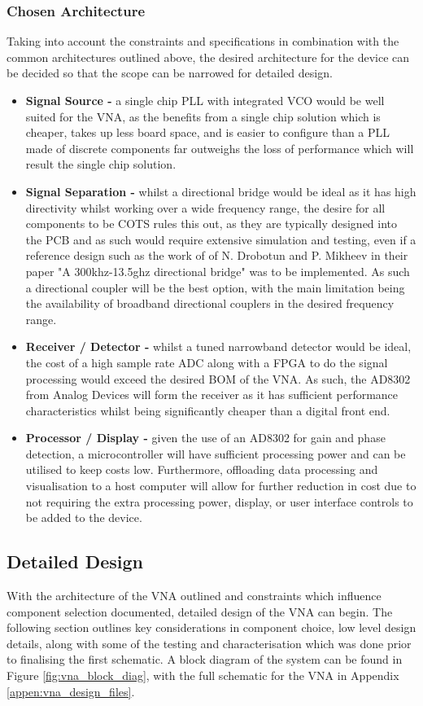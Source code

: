 \subsubsection{Chosen Architecture} 
\label{subsubsec:chosen architecture}
Taking into account the constraints and specifications in combination with the common architectures outlined above, the desired architecture for the device can be decided so that the scope can be narrowed for detailed design. 
\begin{itemize}
	\item \textbf{Signal Source -} a single chip PLL with integrated VCO would be well suited for the VNA, as the benefits from a single chip solution which is cheaper, takes up less board space, and is easier to configure than a PLL made of discrete components far outweighs the loss of performance which will result the single chip solution. 
	\item \textbf{Signal Separation -} whilst a directional bridge would be ideal as it has high directivity whilst working over a wide frequency range, the desire for all components to be COTS rules this out, as they are typically designed into the PCB and as such would require extensive simulation and testing, even if a reference design such as the work of of N. Drobotun and P. Mikheev in their paper "A 300khz-13.5ghz directional bridge" \cite{resistive_coupler} was to be implemented. As such a directional coupler will be the best option, with the main limitation being the availability of broadband directional couplers in the desired frequency range. 
	\item \textbf{Receiver / Detector -} whilst a tuned narrowband detector would be ideal, the cost of a high sample rate ADC along with a FPGA to do the signal processing would exceed the desired BOM of the VNA. As such, the AD8302 from Analog Devices will form the receiver as it has sufficient performance characteristics whilst being significantly cheaper than a digital front end. 
	\item \textbf{Processor / Display -} given the use of an AD8302 for gain and phase detection, a microcontroller will have sufficient processing power and can be utilised to keep costs low. Furthermore, offloading data processing and visualisation to a host computer will allow for further reduction in cost due to not requiring the extra processing power, display, or user interface controls to be added to the device.
\end{itemize}

\subsection{Detailed Design}
\label{subsec:detailed_design}
With the architecture of the VNA outlined and constraints which influence component selection documented, detailed design of the VNA can begin. The following section outlines key considerations in component choice, low level design details, along with some of the testing and characterisation which was done prior to finalising the first schematic. A block diagram of the system can be found in Figure \ref{fig:vna_block_diag}, with the full schematic for the VNA in Appendix \ref{appen:vna_design_files}.

